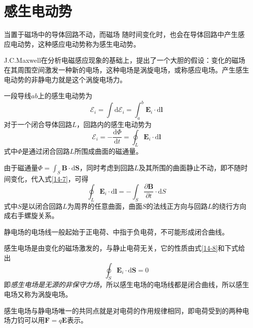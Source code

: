 \documentclass[12pt]{article}
\newcommand{\rmd}{\mathrm{d}}
\newcommand{\deriv}[2]{\frac{\rmd #1}{\rmd #2}}
\newcommand{\pderiv}[2]{\frac{\partial #1}{\partial #2}}
\begin{document}
\section{感生电动势}

当置于磁场中的导体回路不动，而磁场 随时间变化时，也会在导体回路中产生感应电动势，这种感应电动势称为感生电动势。

J.C.Maxwell在分析电磁感应现象的基础上，提出了一个大胆的假设：变化的磁场在其周围空间激发一种新的电场，这种电场是涡旋电场，或称感应电场。产生感生电动势的非静电力就是这个涡旋电场力。

一段导线\(ab\)上的感生电动势为
\begin{equation}
    \mathcal{E}_i = \int \rmd \mathcal{E}_i = \int_{a}^{b} \boldsymbol{E}_i \cdot \rmd \boldsymbol{l}
\end{equation}
对于一个闭合导体回路\(L\)，回路内的感生电动势为
\begin{equation}
    \mathcal{E}_i = -\deriv{\varPhi}{t} = \oint_L \boldsymbol{E}_i \cdot \rmd \boldsymbol{l}
    \label{14-7}
\end{equation}
式中\(\varPhi\)是通过闭合回路\(L\)所围成曲面的磁通量。

由于磁通量\(\varPhi = \int_S \boldsymbol{B} \cdot \rmd \boldsymbol{S}\)，同时考虑到回路\(L\)及其所围的曲面静止不动，即不随时间变化，代入式\ref{14-7}，可得
\begin{equation}
    \oint_L \boldsymbol{E}_i \cdot \rmd \boldsymbol{l} = -\int_{S} \pderiv{\boldsymbol{B}}{t} \cdot \rmd S
    \label{14-8}
\end{equation}
式中\(S\)是以闭合回路\(L\)为周界的任意曲面，曲面\(S\)的法线正方向与回路\(L\)的绕行方向成右手螺旋关系。

静电场的电场线一般起始于正电荷、中指于负电荷，不可能形成闭合曲线。

感生电场是由变化的磁场激发的，与静止电荷无关，它的性质由式\ref{14-8}和下式给出
\begin{equation}
    \oint_S \boldsymbol{E}_i \cdot \rmd \boldsymbol{S} = 0
\end{equation}
即\emph{感生电场是无源的非保守力场}，所以感生电场的电场线都是闭合曲线，所以感生电场又称为涡旋电场。

感生电场与静电场唯一的共同点就是对电荷的作用规律相同，即电荷受到的两种电场力钧可以用\(\boldsymbol{F} = q \boldsymbol{E}\)表示。
\end{document}
